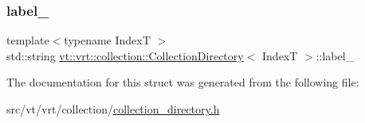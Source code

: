 \subsubsection{\texorpdfstring{label\+\_\+}{label\_}}
{\footnotesize\ttfamily template$<$typename IndexT $>$ \\
std\+::string \hyperlink{structvt_1_1vrt_1_1collection_1_1_collection_directory}{vt\+::vrt\+::collection\+::\+Collection\+Directory}$<$ IndexT $>$\+::label\+\_\+}



The documentation for this struct was generated from the following file\+:\begin{DoxyCompactItemize}
\item 
src/vt/vrt/collection/\hyperlink{collection__directory_8h}{collection\+\_\+directory.\+h}\end{DoxyCompactItemize}
